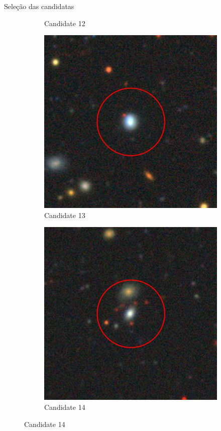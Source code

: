 \begin{frame}[c]{Seleção das candidatas}
\begin{figure}[]
\begin{subfigure}[b]{0.13\textwidth}
            \caption{Candidate 12}
        \end{subfigure}
        \begin{subfigure}[b]{0.13\textwidth}
            \includegraphics[width=\textwidth]{images/candidata_final/13.jpg}
            \caption{Candidate 13}
        \end{subfigure}
        \begin{subfigure}[b]{0.13\textwidth}
            \includegraphics[width=\textwidth]{images/candidata_final/14.jpg}
            \caption{Candidate 14}
        \end{subfigure}
    \end{figure}
\end{frame}

